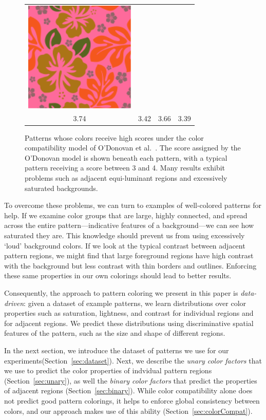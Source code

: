 \begin{figure}[htb]
\begin{tabular}{cccc}
\includegraphics[width=.2\columnwidth]{figs/colorCompat/r_1_3_3-39}\\
3.74&3.42&3.66&3.39\\
\end{tabular}
\caption{Patterns whose colors receive high scores under the color compatibility model of O'Donovan et al.~. The score assigned by the O'Donovan model is shown beneath each pattern, with a typical pattern receiving a score between 3 and 4. Many results exhibit problems such as adjacent equi-luminant regions and excessively saturated backgrounds.}
\label{fig:ColorCompatOnly}
\end{figure}

To overcome these problems, we can turn to examples of well-colored patterns for help. If we examine color groups that are large, highly connected, and spread across the entire pattern---indicative features of a background---we can see how saturated they are. This knowledge should prevent us from using excessively `loud' background colors. If we look at the typical contrast between adjacent pattern regions, we might find that large foreground regions have high contrast with the background but less contrast with thin borders and outlines. Enforcing these same properties in our own colorings should lead to better results.

Consequently, the approach to pattern coloring we present in this paper is \emph{data-driven}: given a dataset of example patterns, we learn distributions over color properties such as saturation, lightness, and contrast for individual regions and for adjacent regions. We predict these distributions using discriminative spatial features of the pattern, such as the size and shape of different regions.

In the next section, we introduce the dataset of patterns we use for our experiments(Section~\ref{sec:dataset}). Next, we describe the \emph{unary color factors} that we use to predict the color properties of indvidual pattern regions (Section~\ref{sec:unary}), as well the \emph{binary color factors} that predict the properties of adjacent regions (Section~\ref{sec:binary}). While color compatibility alone does not predict good pattern colorings, it helps to enforce global consistency between colors, and our approach makes use of this ability (Section~\ref{sec:colorCompat}).

